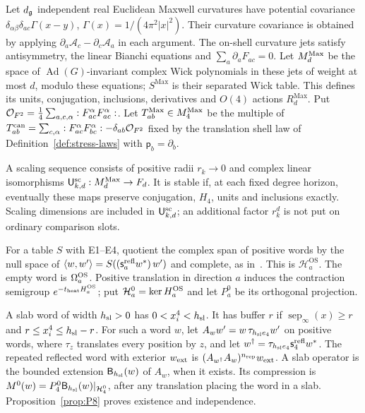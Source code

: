 \begin{definition}\label{def:maxwell}
Let $d_{\mathfrak{g}}$ independent real Euclidean Maxwell curvatures have potential covariance $\delta_{\alpha\beta}\delta_{ac}\Gamma(x-y)$, $\Gamma(x)=1/(4\pi^2|x|^2)$. Their curvature covariance is obtained by applying $\partial_a\mathcal A_c-\partial_c\mathcal A_a$ in each argument. The on-shell curvature jets satisfy antisymmetry, the linear Bianchi equations and $\sum_a\partial_aF_{ac}=0$. Let $M_{d}^{\mathrm{Max}}$ be the space of $\operatorname{Ad}(G)$-invariant complex Wick polynomials in these jets of weight at most $d$, modulo these equations; $S^{\mathrm{Max}}$ is their separated Wick table. This defines its units, conjugation, inclusions, derivatives and $O(4)$ actions $R_d^{\mathrm{Max}}$. Put $\mathcal{O}_{F^2}=\frac14\sum_{a,c,\alpha}:F^\alpha_{ac}F^\alpha_{ac}:$. Let $T^{\mathrm{Max}}_{ab}\in M_{4}^{\mathrm{Max}}$ be the multiple of $T^{\rm can}_{ab}=\sum_{c,\alpha}:F^\alpha_{ac}F^\alpha_{bc}:-\delta_{ab}\mathcal{O}_{F^2}$ fixed by the translation shell law of Definition~\ref{def:stress-laws} with $\mathsf p_b=\partial_b$.

A scaling sequence consists of positive radii $r_k\to0$ and complex linear isomorphisms $\mathsf{U}_{k,d}^{\mathrm{sc}}:M_{d}^{\mathrm{Max}}\to F_d$. It is stable if, at each fixed degree horizon, eventually these maps preserve conjugation, $H_4$, units and inclusions exactly. Scaling dimensions are included in $\mathsf{U}_{k,d}^{\mathrm{sc}}$; an additional factor $r_k^{d}$ is not put on ordinary comparison slots.
\end{definition}

\begin{definition}\label{def:os-spaces}
For a table $S$ with E1--E4, quotient the complex span of positive words by the null space of $\langle w,w'\rangle=S((\mathsf s_a^{\rm refl}w^*)\,w')$ and complete, as in~\cite[Section~4.1, p.~91]{OsterwalderSchrader1973}. This is $\mathcal H^{\mathrm{OS}}_a$. The empty word is $\Omega_a^{\rm OS}$. Positive translation in direction $a$ induces the contraction semigroup $e^{-t_{\rm heat}H_a^{\rm OS}}$; put $\mathcal H^0_a=\ker H_a^{\rm OS}$ and let $P^0_a$ be its orthogonal projection.

A slab word of width $h_{\rm sl}>0$ has $0<x_i^4<h_{\rm sl}$. It has buffer $r$ if $\operatorname{sep}_\infty(x)\ge r$ and $r\le x_i^4\le h_{\rm sl}-r$. For such a word $w$, let $A_ww'=w\,\tau_{h_{\rm sl} e_4}w'$ on positive words, where $\tau_z$ translates every position by $z$, and let $w^\dagger=\tau_{h_{\rm sl} e_4}\mathsf s_4^{\rm refl}w^*$. The repeated reflected word with exterior $w_{\rm ext}$ is $(A_{w^\dagger}A_w)^{n_{\rm rep}}w_{\rm ext}$. A slab operator is the bounded extension $\mathsf B_{h_{\rm sl}}(w)$ of $A_w$, when it exists. Its compression is $M^0(w)=P^0_4\mathsf B_{h_{\rm sl}}(w)|_{\mathcal H^0_4}$, after any translation placing the word in a slab. Proposition~\ref{prop:P8} proves existence and independence.
\end{definition}

